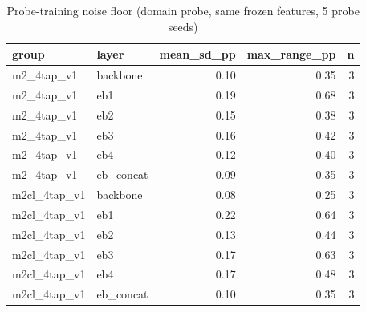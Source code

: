 \begin{table}
\caption{Probe-training noise floor (domain probe, same frozen features, 5 probe seeds)}
\label{tab:leak_noise_floor}
\begin{tabular}{llrrr}
\toprule
group & layer & mean\_sd\_pp & max\_range\_pp & n \\
\midrule
m2\_4tap\_v1 & backbone & 0.10 & 0.35 & 3 \\
m2\_4tap\_v1 & eb1 & 0.19 & 0.68 & 3 \\
m2\_4tap\_v1 & eb2 & 0.15 & 0.38 & 3 \\
m2\_4tap\_v1 & eb3 & 0.16 & 0.42 & 3 \\
m2\_4tap\_v1 & eb4 & 0.12 & 0.40 & 3 \\
m2\_4tap\_v1 & eb\_concat & 0.09 & 0.35 & 3 \\
m2cl\_4tap\_v1 & backbone & 0.08 & 0.25 & 3 \\
m2cl\_4tap\_v1 & eb1 & 0.22 & 0.64 & 3 \\
m2cl\_4tap\_v1 & eb2 & 0.13 & 0.44 & 3 \\
m2cl\_4tap\_v1 & eb3 & 0.17 & 0.63 & 3 \\
m2cl\_4tap\_v1 & eb4 & 0.17 & 0.48 & 3 \\
m2cl\_4tap\_v1 & eb\_concat & 0.10 & 0.35 & 3 \\
\bottomrule
\end{tabular}
\end{table}
